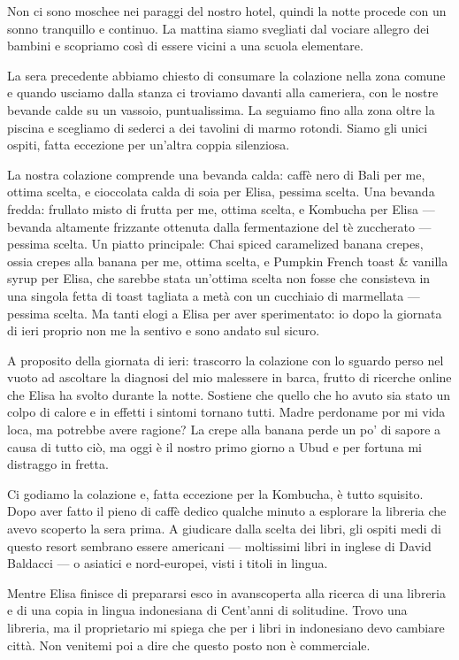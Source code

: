 Non ci sono moschee nei paraggi del nostro hotel, quindi la notte procede con un sonno tranquillo e continuo. La mattina siamo svegliati dal vociare allegro dei bambini e scopriamo così di essere vicini a una scuola elementare.

La sera precedente abbiamo chiesto di consumare la colazione nella zona comune e quando usciamo dalla stanza ci troviamo davanti alla cameriera, con le nostre bevande calde su un vassoio, puntualissima. La seguiamo fino alla zona oltre la piscina e scegliamo di sederci a dei tavolini di marmo rotondi. Siamo gli unici ospiti, fatta eccezione per un'altra coppia silenziosa.

La nostra colazione comprende una bevanda calda: caffè nero di Bali per me, ottima scelta, e cioccolata calda di soia per Elisa, pessima scelta. Una bevanda fredda: frullato misto di frutta per me, ottima scelta, e Kombucha per Elisa — bevanda altamente frizzante ottenuta dalla fermentazione del tè zuccherato — pessima scelta. Un piatto principale: Chai spiced caramelized banana crepes, ossia crepes alla banana per me, ottima scelta, e Pumpkin French toast \& vanilla syrup per Elisa, che sarebbe stata un'ottima scelta non fosse che consisteva in una singola fetta di toast tagliata a metà con un cucchiaio di marmellata — pessima scelta. Ma tanti elogi a Elisa per aver sperimentato: io dopo la giornata di ieri proprio non me la sentivo e sono andato sul sicuro.

A proposito della giornata di ieri: trascorro la colazione con lo sguardo perso nel vuoto ad ascoltare la diagnosi del mio malessere in barca, frutto di ricerche online che Elisa ha svolto durante la notte. Sostiene che quello che ho avuto sia stato un colpo di calore e in effetti i sintomi tornano tutti. Madre perdoname por mi vida loca, ma potrebbe avere ragione? La crepe alla banana perde un po' di sapore a causa di tutto ciò, ma oggi è il nostro primo giorno a Ubud e per fortuna mi distraggo in fretta.

Ci godiamo la colazione e, fatta eccezione per la Kombucha, è tutto squisito. Dopo aver fatto il pieno di caffè dedico qualche minuto a esplorare la libreria che avevo scoperto la sera prima. A giudicare dalla scelta dei libri, gli ospiti medi di questo resort sembrano essere americani — moltissimi libri in inglese di David Baldacci — o asiatici e nord-europei, visti i titoli in lingua.

Mentre Elisa finisce di prepararsi esco in avanscoperta alla ricerca di una libreria e di una copia in lingua indonesiana di Cent'anni di solitudine. Trovo una libreria, ma il proprietario mi spiega che per i libri in indonesiano devo cambiare città. Non venitemi poi a dire che questo posto non è commerciale.

